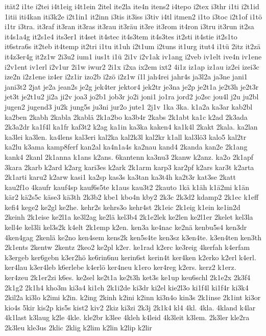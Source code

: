 {ität2
i1te
i2tei
i4t1eig
i4t1ein
2itel
ite2la
ite4n
itens2
i4tepo
i2tex
i3thr
i1ti
i2t1id
1itii
iti4kan
iti3k2e
i2t1in1
it2inn
i3tis
it3iss
i3tiv
i4tl
itmen2
i1to
i3toc
i2t1of
i1tö
i1tr
i3tra.
it3raf
it3ran
it3ras
it3rau
it3räu
it3re
it3rom
it4ron
i3tru
it3run
it2sa
it4s1a4g
it2s1e4
its3er1
it4set
it4stec
it4s3tem
it4s3tes
it2sti
it4stie
it2s1to
it6stra6s
it2teb
it4temp
it2tri
i1tu
it1uh
i2t1um
i2tuns
it1urg
itut4
i1tü
2itz
it2zä
it4z3er4g
it2z1w
2i3u2
ium1
ius1t
i1ü
2i1v
i2v1ak
iv1ang
i2veb
iv1elt
ive4n
iv1ene
i2v1ent
iv1erl
i2v1ur
2i1w
iwur2
2i1x
i2xa
ix2em
ixt2
4i1z
iz1ap
iz1au
iz2ei
izei3c
ize2n
i2z1ene
iz4er
i2z1ir
izo2b
i2zö
i2z1w
í1l
jah4rei
jahr4s
ja3l2a
ja3ne
jani1
jani3t2
2jat
je2a
jean2s
je2g
jek4ter
jektor4
jek2tr
je3na
je2p
je2t1a
je2t3h
je2t3r
jet3t
je2t1u2
ji2a
ji2v
joa3
jo2b1
job3r
jo2i
joni1
jo1ra
jord2
jo2sc
jou4l
j2u
ju2bl
jugen2
jugend3
ju2k
jung5s
ju3ni
jur2o
jute1
2j1v
1ka
3ka.
k1a2a
ka3ar
kab2bl
ka2ben
2kabh
2kabla
2kablä
2k1a2bo
ka3b4r
2kabs
2k1abt
ka1c
k2ad
2k3ada
2k3a2dr
ka1f4l
ka1fr
kaf3t2
k2ag
ka1in
ka3ka
kaken4
ka1k4l
2kakt
2kala.
ka2lan
ka3lei
ka3len.
ka4lens
kal3eri
kal2ka
kal2k3l
kal2kr
k1all
kal3lö3
kalo5
kal2tr
ka2lu
k3ama
kamp8ferf
kan2al
ka4n1a4s
ka2nau
kand4
2kanda
kan2e
2k1ang
kank4
2kanl
2k1anna
k1ans
k2ans.
6kantenn
ka3nu3
2kanw
k2anz.
ka2o
2k1apf
3kara
2karb
k2ard
k2arg
kari3es
k2ark
2k1arm
karp3
kar2pf
k2ars
kar3t
k2arta
2k1arti
karu2
k2arw
kasi1
ka2sp
kas3s
ka3tan
ka3t4h
ka2t3r
kat3se
2katt
kau2f1o
4kaufr
kauf4sp
kauf6s5te
k1aus
kau3t2
2kauto
1kä
k1äh
k1ä2mi
k1än
kär2
kä2s5c
käse3
kä3th
2k3b2
kbe1
kbo4n
kby2
2k3c
2k3d2
kdamp2
2k1ec
k1eff
kefi4
kege2
ke2gl
ke2he.
kehr2s
kehrs3o
kehr4st
2k1eic
2k1eig
k1ein
ke1in2d
2keinh
2k1eise
ke2l1a
ke3l2ag
ke2lä
kel3b4
2k1e2lek
ke2len
ke2l1er
2kelet
kel3la
kell4e
kel3li
kel3s2k
k4elt
2k1emp
k2en.
ken3a
ke4nac
ke2nä
kenbu5s4
ken3dr
4ken4gag
2kenlä
ke2no
ken4sem
kens2k
ken5s4te
ken3sz
k3en4te.
k3en4ten
ken3th
2k1ents
2kentw
2kentz
2keo2
ke2pl
k2er.
ke1rad
k2erc
ke3reig
4kerfah
k4erfam
k3ergeb
ker6gebn
k3er2hö
ke6rin6nu
kerin6st
kerin4t
ker4ken
k2erko
k2erl
k4erl.
ker4lau
k3er4leb
k6erlebe
k4erlö
ker4neu
k1ero
ker4reg
k2ers.
kerz2
k1erz.
ker4zeu
2k1er2zi
k6es.
ke2sel
ke2t1a
ke2t3h
ket3s
ke1up
keu6schl
2k1e2x
2k3f4
2k1g2
2k1h4
kho3m
ki3a4
ki1ch
2k1i2de
ki3dr
ki2el
kie2l3o
ki1f4l
ki1f4r
ki3k4
2kil2a
ki3lo
k2imi
k2in.
k2ing
2kinh
k2ini
k2inn
ki3n4o
kin3s
2k1inse
2k1int
ki3or
kio4s
5kir
kis2p
kis5s
kist2
kiv2
2kiz
ki3zi
2k3j
2k1k4
kl4
4kl.
4kla.
4kland
k4lar
4k1last
k3laug
k2le
4kle.
kle2br
k3lee
4kleh
k4leid
4k3leit
k3lem.
2k3ler
kle2ra
2k3leu
kle3us
2klic
2klig
k2lim
k2lin
k2lip
k2lir
}
